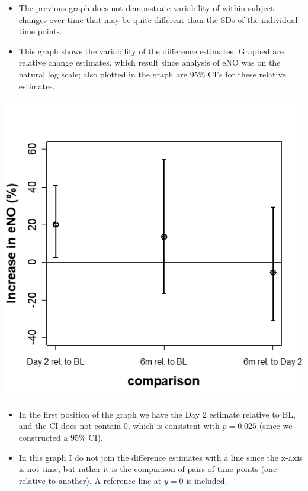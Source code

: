 \documentclass[
  9pt,
  ignorenonframetext,
]{beamer}
\begin{document}
\begin{frame}{}
\protect\hypertarget{section-6}{}
\begin{itemize}
\item
  The previous graph does not demonstrate variability of within-subject
  changes over time that may be quite different than the SDs of the
  individual time points.
\item
  This graph shows the variability of the difference estimates. Graphed
  are relative change estimates, which result since analysis of eNO was
  on the natural log scale; also plotted in the graph are 95\% CI's for
  these relative estimates.
\end{itemize}

\tiny

\begin{center}\includegraphics[width=0.4\linewidth]{figs_L2/L2-f9} \end{center}

\tiny
\end{frame}

\begin{frame}{}
\protect\hypertarget{section-7}{}
\begin{itemize}
\item
  In the first position of the graph we have the Day 2 estimate relative
  to BL, and the CI does not contain 0, which is consistent with
  \(p=0.025\) (since we constructed a 95\% CI).
\item
  In this graph I do not join the difference estimates with a line since
  the x-axis is not time, but rather it is the comparison of pairs of
  time points (one relative to another). A reference line at \(y=0\) is
  included.
\end{itemize}
\end{frame}
\end{document}
